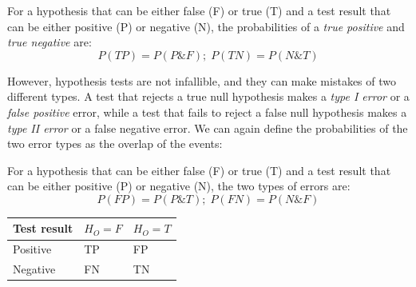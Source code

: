 \documentclass[
  letterpaper,
  DIV=11,
  numbers=noendperiod]{scrreprt}
\begin{document}
\begin{tcolorbox}[enhanced jigsaw, arc=.35mm, colframe=quarto-callout-note-color-frame, left=2mm, opacitybacktitle=0.6, breakable, title=\textcolor{quarto-callout-note-color}{\faInfo}\hspace{0.5em}{Definition}, toprule=.15mm, coltitle=black, bottomtitle=1mm, toptitle=1mm, colback=white, leftrule=.75mm, colbacktitle=quarto-callout-note-color!10!white, titlerule=0mm, opacityback=0, rightrule=.15mm, bottomrule=.15mm]

For a hypothesis that can be either false (F) or true (T) and a test
result that can be either positive (P) or negative (N), the
probabilities of a \emph{true positive} and \emph{true negative} are:
\[ 
P(TP) = P(P \& F); \; P(TN) = P(N \& T)
\]

\end{tcolorbox}

However, hypothesis tests are not infallible, and they can make mistakes
of two different types. A test that rejects a true null hypothesis makes
a \emph{type I error} or a \emph{false positive} error, while a test
that fails to reject a false null hypothesis makes a \emph{type II
error} or a false negative error. We can again define the probabilities
of the two error types as the overlap of the events:

\begin{tcolorbox}[enhanced jigsaw, arc=.35mm, colframe=quarto-callout-note-color-frame, left=2mm, opacitybacktitle=0.6, breakable, title=\textcolor{quarto-callout-note-color}{\faInfo}\hspace{0.5em}{Definition}, toprule=.15mm, coltitle=black, bottomtitle=1mm, toptitle=1mm, colback=white, leftrule=.75mm, colbacktitle=quarto-callout-note-color!10!white, titlerule=0mm, opacityback=0, rightrule=.15mm, bottomrule=.15mm]

For a hypothesis that can be either false (F) or true (T) and a test
result that can be either positive (P) or negative (N), the two types of
errors are: \[ 
P(FP) = P(P \& T); \; P(FN) = P(N \& F)
\]

\end{tcolorbox}

\begin{longtable}[]{@{}lll@{}}
\toprule()
Test result & \(H_O = F\) & \(H_O=T\) \\
\midrule()
\endhead
Positive & TP & FP \\
Negative & FN & TN \\
\bottomrule()
\end{longtable}
\end{document}
